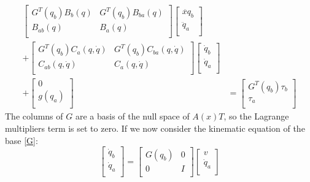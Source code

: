 \begin{equation}
\begin{split}
\left[\begin{matrix}G^T(q_b)B_b(q)&G^T(q_b)B_{ba}(q)\\B_{ab}(q)&B_a(q)\\\end{matrix}\right]\left[\begin{matrix}\ddot{x
q}_b\\\ddot{q}_a\\\end{matrix}\right] &\\
+\left[\begin{matrix}G^T(q_b)C_a(q,\dot{q})&G^T(q_b)C_{ba}(q,\dot{q})\\C_{ab}(q,\dot{q})&C_a(q,\dot{q})\\\end{matrix}\right]\left[\begin{matrix}\dot{q}_b\\\dot{q}_a\\\end{matrix}\right] &\\
+\left[\begin{matrix}0\\g(q_a)\\\end{matrix}\right]
&= \left[\begin{matrix}G^T(q_b)\tau_b\\\tau_a\\\end{matrix}\right]
\end{split}
\end{equation}
The columns of $G$ are a basis of the null space of $A(x)T$, so the Lagrange multipliers term is set to zero.
If we now consider the kinematic equation of the base \ref{G}:
\begin{equation}
\left[\begin{matrix}\dot{q}_b\\\dot{q}_a\\\end{matrix}\right]=\left[\begin{matrix}G(q_b)&0\\0&I\\\end{matrix}\right]\left[\begin{matrix}v\\\dot{q}_a\\\end{matrix}\right]
\end{equation}
